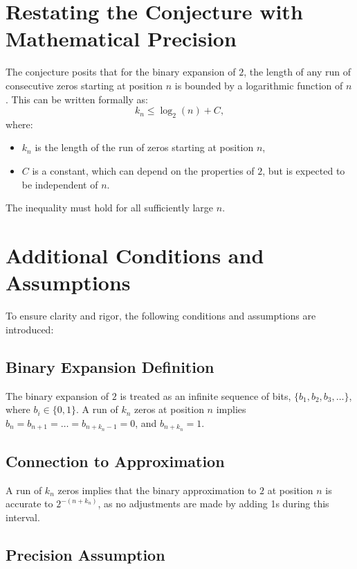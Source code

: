 
\section{Restating the Conjecture with Mathematical Precision}

The conjecture posits that for the binary expansion of \(2\), the length of any run of consecutive zeros starting at position \(n\) is bounded by a logarithmic function of \(n\). This can be written formally as:
\[
k_n \leq \log_2(n) + C,
\]
where:
\begin{itemize}
    \item \(k_n\) is the length of the run of zeros starting at position \(n\),
    \item \(C\) is a constant, which can depend on the properties of \(2\), but is expected to be independent of \(n\).
\end{itemize}
The inequality must hold for all sufficiently large \(n\).

\section*{Additional Conditions and Assumptions}

To ensure clarity and rigor, the following conditions and assumptions are introduced:

\subsection*{Binary Expansion Definition}

The binary expansion of \(2\) is treated as an infinite sequence of bits, \(\{b_1, b_2, b_3, \ldots\}\), where \(b_i \in \{0, 1\}\). A run of \(k_n\) zeros at position \(n\) implies \(b_n = b_{n+1} = \ldots = b_{n+k_n-1} = 0\), and \(b_{n+k_n} = 1\).

\subsection*{Connection to Approximation}

A run of \(k_n\) zeros implies that the binary approximation to \(2\) at position \(n\) is accurate to \(2^{-(n+k_n)}\), as no adjustments are made by adding 1s during this interval.

\subsection*{Precision Assumption}

